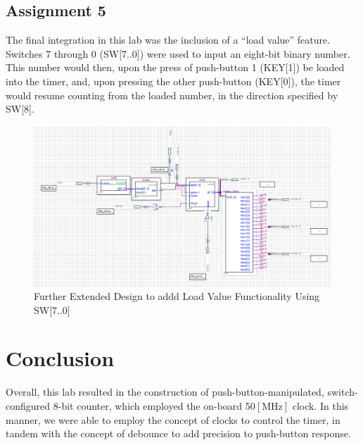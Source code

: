 \documentclass[
	letterpaper, %
	10pt, %
]{CSUniSchoolLabReport}
\begin{document}
\subsection{Assignment 5}

\hspace{.5 in} The final integration in this lab was the inclusion of a ``load value'' feature. Switches 7 through 0 (SW[7..0]) were used to input an eight-bit binary number. This number would then, upon the press of push-button 1 (KEY[1]) be loaded into the timer, and, upon pressing the other push-button (KEY[0]), the timer would resume counting from the loaded number, in the direction specified by SW[8].

\begin{figure}[H]
  \centering
  \includegraphics[width=.72\textwidth]{Figures/Assign5.png}
  \caption{Further Extended Design to addd Load Value Functionality Using SW[7..0]}
  \label{fig:4}
\end{figure}


\section{Conclusion}

\hspace{.5 in} Overall, this lab resulted in the construction of push-button-manipulated, switch-configured 8-bit counter, which employed the on-board 50$[\si{\mega\hertz}]$ clock. In this manner, we were able to employ the concept of clocks to control the timer, in tandem with the concept of debounce to add precision to push-button response.
\end{document}
